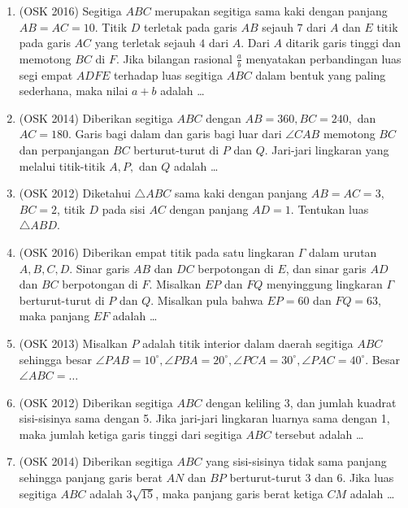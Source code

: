 \documentclass[11pt]{scrartcl}
\begin{document}
\begin{enumerate}
\item (OSK 2016) Segitiga $ABC$ merupakan segitiga sama kaki dengan panjang $AB = AC = 10 $.
	Titik $D$ terletak pada garis $AB$ sejauh $7 $ dari $A$ dan $E$ titik pada garis $AC$ yang
	terletak sejauh $4 $ dari $A$. Dari $A$ ditarik garis tinggi dan memotong $BC$ di $F$.
	Jika bilangan rasional $\frac{a}{b}$ menyatakan perbandingan luas segi empat $ADFE$ terhadap
	luas segitiga $ABC$ dalam bentuk yang paling sederhana, maka nilai $a + b$ adalah \dots
	
	\item (OSK 2014) Diberikan segitiga $ABC$ dengan $AB = 360, BC = 240,$ dan $AC = 180$. Garis
	bagi dalam dan garis bagi luar dari $\angle CAB$ memotong $BC$ dan perpanjangan $BC$
	berturut-turut di $P$ dan $Q$. Jari-jari lingkaran yang melalui titik-titik $A, P,$ dan $Q$
	adalah \dots
	
	\item (OSK 2012) Diketahui $\triangle ABC$ sama kaki dengan panjang $AB = AC = 3$, $BC = 2$, titik $D$ pada sisi $AC$ dengan panjang $AD = 1$. Tentukan luas $\triangle ABD$.
            
            \item (OSK 2016) Diberikan empat titik pada satu lingkaran $\Gamma$ dalam urutan $A,B,C,D$. Sinar garis $AB$ dan $DC$ berpotongan di $E$, dan sinar garis $AD$ dan $BC$ berpotongan di $F$. Misalkan $EP$ dan $FQ$ menyinggung lingkaran $\Gamma$ berturut-turut di $P$ dan $Q$. Misalkan pula bahwa $EP=60$ dan $FQ=63$, maka panjang $EF$ adalah \dots
            
            \item (OSK 2013) Misalkan $P$ adalah titik interior dalam daerah segitiga $ABC$ sehingga besar $\angle PAB = 10^\circ, \angle PBA = 20^\circ, \angle PCA = 30^\circ, \angle PAC=40^\circ$. Besar $\angle ABC = \dots$
            
            \item (OSK 2012) Diberikan segitiga $ABC$ dengan keliling 3, dan jumlah kuadrat sisi-sisinya sama dengan 5. Jika jari-jari lingkaran luarnya sama dengan 1, maka jumlah ketiga garis tinggi dari segitiga $ABC$ tersebut adalah \dots
            
            \item (OSK 2014) Diberikan segitiga $ABC$ yang sisi-sisinya tidak sama panjang sehingga panjang garis berat $AN$ dan $BP$ berturut-turut 3 dan 6. Jika luas segitiga $ABC$ adalah $3\sqrt{15}$, maka panjang garis berat ketiga $CM$ adalah \dots
            

\end{enumerate}
\end{document}

